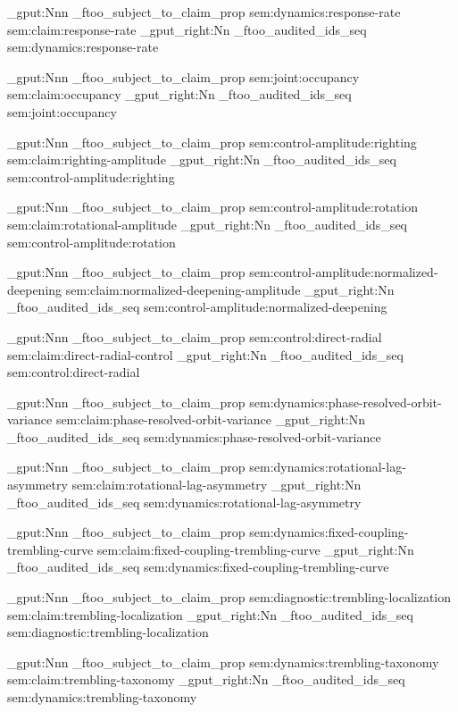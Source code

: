 \prop_gput:Nnn \g_ftoo_subject_to_claim_prop { sem:dynamics:response-rate } { sem:claim:response-rate }
\seq_gput_right:Nn \g_ftoo_audited_ids_seq { sem:dynamics:response-rate }

\prop_gput:Nnn \g_ftoo_subject_to_claim_prop { sem:joint:occupancy } { sem:claim:occupancy }
\seq_gput_right:Nn \g_ftoo_audited_ids_seq { sem:joint:occupancy }

\prop_gput:Nnn \g_ftoo_subject_to_claim_prop { sem:control-amplitude:righting } { sem:claim:righting-amplitude }
\seq_gput_right:Nn \g_ftoo_audited_ids_seq { sem:control-amplitude:righting }

\prop_gput:Nnn \g_ftoo_subject_to_claim_prop { sem:control-amplitude:rotation } { sem:claim:rotational-amplitude }
\seq_gput_right:Nn \g_ftoo_audited_ids_seq { sem:control-amplitude:rotation }

\prop_gput:Nnn \g_ftoo_subject_to_claim_prop { sem:control-amplitude:normalized-deepening } { sem:claim:normalized-deepening-amplitude }
\seq_gput_right:Nn \g_ftoo_audited_ids_seq { sem:control-amplitude:normalized-deepening }

\prop_gput:Nnn \g_ftoo_subject_to_claim_prop { sem:control:direct-radial } { sem:claim:direct-radial-control }
\seq_gput_right:Nn \g_ftoo_audited_ids_seq { sem:control:direct-radial }

\prop_gput:Nnn \g_ftoo_subject_to_claim_prop { sem:dynamics:phase-resolved-orbit-variance } { sem:claim:phase-resolved-orbit-variance }
\seq_gput_right:Nn \g_ftoo_audited_ids_seq { sem:dynamics:phase-resolved-orbit-variance }

\prop_gput:Nnn \g_ftoo_subject_to_claim_prop { sem:dynamics:rotational-lag-asymmetry } { sem:claim:rotational-lag-asymmetry }
\seq_gput_right:Nn \g_ftoo_audited_ids_seq { sem:dynamics:rotational-lag-asymmetry }

\prop_gput:Nnn \g_ftoo_subject_to_claim_prop { sem:dynamics:fixed-coupling-trembling-curve } { sem:claim:fixed-coupling-trembling-curve }
\seq_gput_right:Nn \g_ftoo_audited_ids_seq { sem:dynamics:fixed-coupling-trembling-curve }

\prop_gput:Nnn \g_ftoo_subject_to_claim_prop { sem:diagnostic:trembling-localization } { sem:claim:trembling-localization }
\seq_gput_right:Nn \g_ftoo_audited_ids_seq { sem:diagnostic:trembling-localization }

\prop_gput:Nnn \g_ftoo_subject_to_claim_prop { sem:dynamics:trembling-taxonomy } { sem:claim:trembling-taxonomy }
\seq_gput_right:Nn \g_ftoo_audited_ids_seq { sem:dynamics:trembling-taxonomy }

